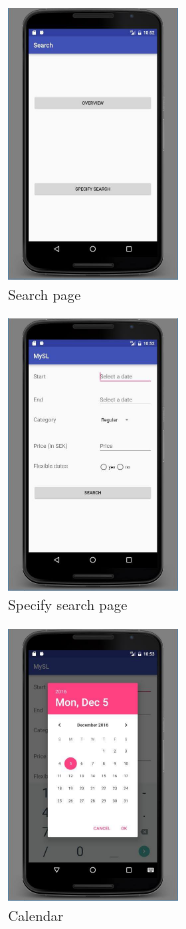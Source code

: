\documentclass[11pt,twoside,a4paper]{report}
\begin{document}
\begin{appendices}
\begin{figure}
	\centering
	\includegraphics[width=0.4\textwidth]{jpg/android-search-page.jpg}
	\caption{Search page}
	\label{figure:search-page}
\end{figure}

\begin{figure}
	\centering
	\includegraphics[width=0.4\textwidth]{jpg/android-specify-search-page.jpg}
	\caption{Specify search page}
	\label{figure:specify-search-page}
\end{figure}

\begin{figure}
	\centering
	\includegraphics[width=0.4\textwidth]{jpg/android-calendar.jpg}
	\caption{Calendar}
	\label{figure:calendar}
\end{figure}


\end{appendices}
\end{document}
